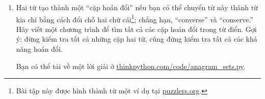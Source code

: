\documentclass[11pt]{book}
\begin{document}
\begin{ex}
\begin{enumerate}


\item Hai từ tạo thành một ``cặp hoán đổi'' nếu bạn có thể chuyển từ này
  thành từ kia chỉ bằng cách đổi chỗ hai chữ cái\footnote{Bài tập này
  được hình thành từ một ví dụ tại \url{puzzlers.org}.}; chẳng hạn,
  ``converse'' và ``conserve.''  Hãy viết một chương trình để tìm tất cả
  các cặp hoán đổi trong từ điển. Gợi ý: đừng kiểm tra tất cả những cặp
  hai từ, cũng đừng kiểm tra tất cả các khả năng hoán đổi.

Bạn có thể tải về một lời giải ở \url{thinkpython.com/code/anagram_sets.py}.

\end{enumerate}
\end{ex}
\end{document}
